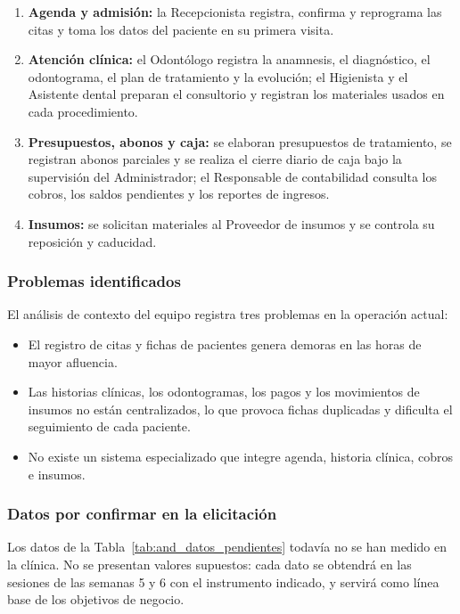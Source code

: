 \documentclass[12pt,a4paper]{article}
\begin{document}
\begin{enumerate}
    \item \textbf{Agenda y admisi{\'o}n:} la Recepcionista registra, confirma y reprograma las citas y toma los datos del paciente en su primera visita.
    \item \textbf{Atenci{\'o}n cl{\'i}nica:} el Odont{\'o}logo registra la anamnesis, el diagn{\'o}stico, el odontograma, el plan de tratamiento y la evoluci{\'o}n; el Higienista y el Asistente dental preparan el consultorio y registran los materiales usados en cada procedimiento.
    \item \textbf{Presupuestos, abonos y caja:} se elaboran presupuestos de tratamiento, se registran abonos parciales y se realiza el cierre diario de caja bajo la supervisi{\'o}n del Administrador; el Responsable de contabilidad consulta los cobros, los saldos pendientes y los reportes de ingresos.
    \item \textbf{Insumos:} se solicitan materiales al Proveedor de insumos y se controla su reposici{\'o}n y caducidad.
\end{enumerate}

\subsubsection{Problemas identificados}

El an{\'a}lisis de contexto del equipo registra tres problemas en la operaci{\'o}n actual:

\begin{itemize}
    \item El registro de citas y fichas de pacientes genera demoras en las horas de mayor afluencia.
    \item Las historias cl{\'i}nicas, los odontogramas, los pagos y los movimientos de insumos no est{\'a}n centralizados, lo que provoca fichas duplicadas y dificulta el seguimiento de cada paciente.
    \item No existe un sistema especializado que integre agenda, historia cl{\'i}nica, cobros e insumos.
\end{itemize}

\subsubsection{Datos por confirmar en la elicitaci{\'o}n}

Los datos de la Tabla~\ref{tab:and_datos_pendientes} todav{\'i}a no se han medido en la cl{\'i}nica. No se presentan valores supuestos: cada dato se obtendr{\'a} en las sesiones de las semanas 5 y 6 con el instrumento indicado, y servir{\'a} como l{\'i}nea base de los objetivos de negocio.
\end{document}
